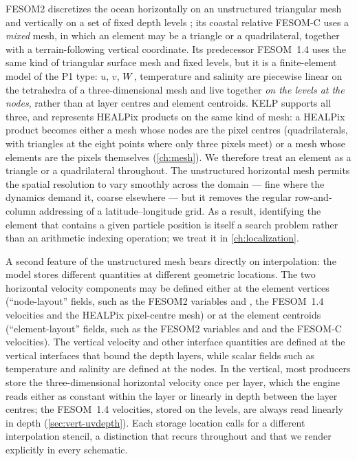 FESOM2 discretizes the ocean horizontally on an unstructured triangular mesh and
vertically on a set of fixed depth levels \citep{danilov2017fesom2}; its coastal
relative FESOM-C uses a \emph{mixed} mesh, in which an element may be a triangle or
a quadrilateral, together with a terrain-following vertical coordinate.
Its predecessor FESOM~1.4 \citep{wang2014fesom14} uses the same kind of triangular surface mesh and
fixed levels, but it is a finite-element model of the P1 type: $u$, $v$, $W$, temperature and
salinity are piecewise linear on the tetrahedra of a three-dimensional mesh and live together \emph{on
the levels at the nodes}, rather than at layer centres and element centroids. \textsf{KELP} supports all
three, and represents HEALPix products on the same kind of mesh: a HEALPix
product becomes either a mesh whose nodes are the pixel centres (quadrilaterals, with triangles at the
eight points where only three pixels meet) or a mesh whose elements are the pixels themselves
(\cref{ch:mesh}). We therefore treat an element as
a triangle or a quadrilateral throughout. The unstructured
horizontal mesh permits the spatial resolution to vary smoothly across the domain
--- fine where the dynamics demand it, coarse elsewhere --- but it removes the
regular row-and-column addressing of a latitude--longitude grid. As a result,
identifying the element that contains a given particle position is itself a
search problem rather than an arithmetic indexing operation; we treat it in
\cref{ch:localization}.

A second feature of the unstructured mesh bears directly on interpolation: the
model stores different quantities at different geometric locations. The two
horizontal velocity components may be defined either at the element vertices
(``node-layout'' fields, such as the FESOM2 variables  and
, the FESOM~1.4 velocities and the HEALPix pixel-centre mesh) or at the element centroids
(``element-layout'' fields, such as the FESOM2 variables  and  and the FESOM-C
velocities). The
vertical velocity and other interface quantities are defined at the vertical
interfaces that bound the depth layers, while scalar fields such as temperature
and salinity are defined at the nodes. In the vertical, most producers store the three-dimensional
horizontal velocity once per layer, which the engine reads either as constant within the layer or
linearly in depth between the layer centres; the FESOM~1.4 velocities, stored on the levels, are always
read linearly in depth (\cref{sec:vert-uvdepth}). Each storage location calls for a
different interpolation stencil, a distinction that recurs throughout
 and that we render explicitly in every schematic.

